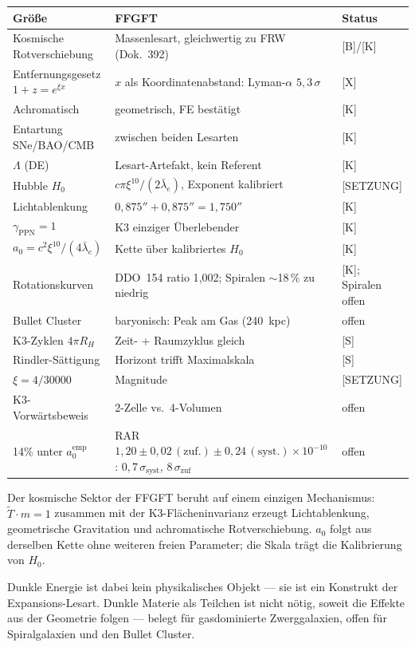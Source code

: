 \begin{center}
\begin{tabular}{lll}
\toprule
Größe & FFGFT & Status \\
\midrule
Kosmische Rotverschiebung & Massenlesart, gleichwertig zu FRW (Dok.~392) & [B]/[K] \\
Entfernungsgesetz $1+z = e^{\xi x}$ & $x$ als Koordinatenabstand: Lyman-$\alpha$ $5{,}3\,\sigma$ & [X] \\
Achromatisch & geometrisch, FE bestätigt & [K] \\
Entartung SNe/BAO/CMB & zwischen beiden Lesarten & [K] \\
$\Lambda$ (DE) & Lesart-Artefakt, kein Referent & [K] \\
Hubble $H_0$ & $c\pi\xi^{10}/(2\bar\lambda_e)$, Exponent kalibriert & [SETZUNG] \\
Lichtablenkung & $0{,}875'' + 0{,}875'' = 1{,}750''$ & [K] \\
$\gamma_\text{PPN} = 1$ & K3 einziger Überlebender & [K] \\
$a_0 = c^2\xi^{10}/(4\bar\lambda_e)$ & Kette über kalibriertes $H_0$ & [K] \\
Rotationskurven & DDO~154 ratio 1{,}002; Spiralen $\sim$18\,\% zu niedrig & [K]; Spiralen offen \\
Bullet Cluster & baryonisch: Peak am Gas (240~kpc) & offen \\
K3-Zyklen $4\pi R_H$ & Zeit- + Raumzyklus gleich & [S] \\
Rindler-Sättigung & Horizont trifft Maximalskala & [S] \\
$\xi = 4/30000$ & Magnitude & [SETZUNG] \\
K3-Vorwärtsbeweis & 2-Zelle vs.\ 4-Volumen & offen \\
14\% unter $a_0^\text{emp}$ & RAR $1{,}20\pm0{,}02\,(\text{zuf.})\pm0{,}24\,(\text{syst.})\times10^{-10}$: $0{,}7\,\sigma_\text{syst}$, $8\,\sigma_\text{zuf}$ & offen \\
\bottomrule
\end{tabular}
\end{center}

\medskip
Der kosmische Sektor der FFGFT beruht auf einem einzigen Mechanismus:
$\tilde T \cdot m = 1$ zusammen mit der K3-Flächeninvarianz erzeugt
Lichtablenkung, geometrische Gravitation und achromatische
Rotverschiebung. $a_0$ folgt aus derselben Kette ohne weiteren freien Parameter; die
Skala trägt die Kalibrierung von $H_0$.

Dunkle Energie ist dabei kein physikalisches Objekt — sie ist ein
Konstrukt der Expansions-Lesart. Dunkle Materie als Teilchen ist nicht
nötig, soweit die Effekte aus der Geometrie folgen --- belegt für
gasdominierte Zwerggalaxien, offen für Spiralgalaxien und den Bullet Cluster.

